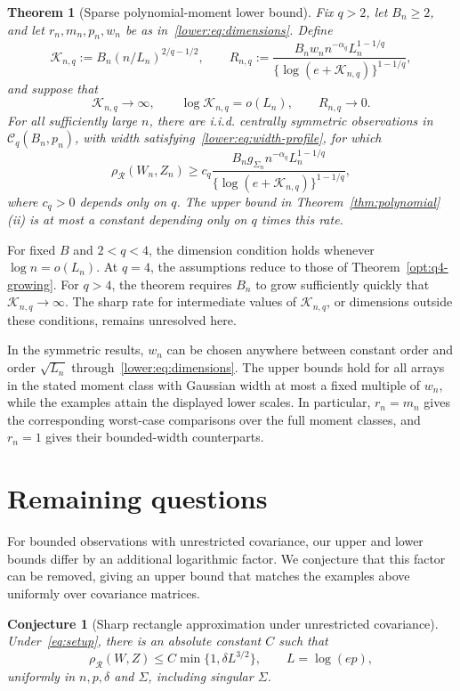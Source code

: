 \documentclass[11pt,letterpaper]{article}
\newenvironment{vSixBlock}{\color{magenta}}{}
\newtheorem{theorem}{Theorem}
\newtheorem{conjecture}{Conjecture}
\theoremstyle{remark}
\newcommand{\rh}{\rho_{\mathcal R}}
\begin{document}
\begin{vSixBlock}
\begin{theorem}[Sparse polynomial-moment lower bound]\label{lower:sparse}
Fix \(q>2\), let \(B_n\ge2\), and let
\(r_n,m_n,p_n,w_n\) be as in~\eqref{lower:eq:dimensions}.
Define
\[
 \mathcal K_{n,q}:=B_n(n/L_n)^{2/q-1/2},\qquad
 R_{n,q}:=\frac{B_n w_n n^{-\alpha_q}L_n^{1-1/q}}
 {\{\log(e+\mathcal K_{n,q})\}^{1-1/q}},
\]
and suppose that
\begin{equation}
 \mathcal K_{n,q}\to\infty,\qquad
 \log\mathcal K_{n,q}=o(L_n),\qquad R_{n,q}\to0.
 \label{lower:sparse-regime}
\end{equation}
For all sufficiently large \(n\), there are i.i.d. centrally symmetric
observations in \(\mathcal C_q(B_n,p_n)\), with width
satisfying~\eqref{lower:eq:width-profile}, for which
\begin{equation}
 \rh(W_n,Z_n)\ge c_q
 \frac{B_n g_{\Sigma_n}n^{-\alpha_q}L_n^{1-1/q}}
 {\{\log(e+\mathcal K_{n,q})\}^{1-1/q}},
 \label{lower:sparse-rate}
\end{equation}
where \(c_q>0\) depends only on \(q\). The upper bound in
Theorem~\ref{thm:polynomial}\textup{(ii)} is at most a constant
depending only on \(q\) times this rate.
\end{theorem}

For fixed \(B\) and \(2<q<4\), the dimension condition holds
whenever \(\log n=o(L_n)\). At \(q=4\), the assumptions reduce
to those of Theorem~\ref{opt:q4-growing}. For \(q>4\), the theorem
requires \(B_n\) to grow sufficiently quickly that
\(\mathcal K_{n,q}\to\infty\). The sharp rate for intermediate
values of \(\mathcal K_{n,q}\), or dimensions outside these
conditions, remains unresolved here.

In the symmetric results, \(w_n\) can be chosen anywhere between
constant order and order \(\sqrt{L_n}\) through~\eqref{lower:eq:dimensions}.
The upper bounds hold for all arrays in the stated moment class
with Gaussian width at most a fixed multiple of \(w_n\), while
the examples attain the displayed lower scales. In particular,
\(r_n=m_n\) gives the corresponding worst-case comparisons over
the full moment classes, and \(r_n=1\) gives their bounded-width
counterparts.
\end{vSixBlock}


\section{Remaining questions}\label{sec:discussion}

For bounded observations with unrestricted covariance, our upper and
lower bounds differ by an additional logarithmic factor. We conjecture
that this factor can be removed, giving an upper bound that matches
the examples above uniformly over covariance matrices.
\begin{conjecture}[Sharp rectangle approximation under unrestricted covariance]
\label{conj:sharp-unrestricted}
Under~\eqref{eq:setup}, there is an absolute constant \(C\) such that
\[
 \rh(W,Z)\le C\min\{1,\delta L^{3/2}\},\qquad L=\log(ep),
\]
uniformly in \(n,p,\delta\) and \(\Sigma\), including singular \(\Sigma\).
\end{conjecture}
\end{document}
